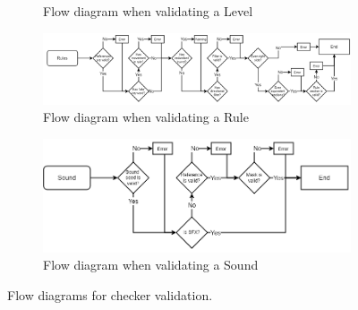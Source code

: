 \begin{figure}[ht]
\begin{subfigure}{1\textwidth}
        \caption{Flow diagram when validating a Level}
    \end{subfigure}
    \begin{subfigure}{1\textwidth}
        \centering
        \includegraphics[scale=0.55]{images/checker/Rule.png}
        \caption{Flow diagram when validating a Rule}
    \end{subfigure}
    \begin{subfigure}{1\textwidth}
        \centering
        \includegraphics[scale=0.45]{images/checker/Sound.png}
        \caption{Flow diagram when validating a Sound}
    \end{subfigure}
    \caption{Flow diagrams for checker validation.}
\end{figure}